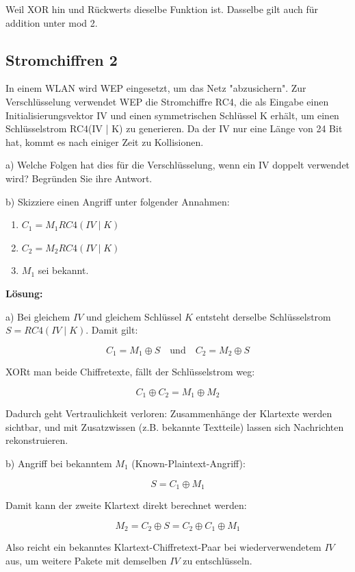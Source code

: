 \documentclass[a4paper]{article}
\begin{document}
Weil XOR hin und Rückwerts dieselbe Funktion ist. Dasselbe gilt auch für addition unter mod 2.

\subsection{Stromchiffren 2}

In einem WLAN wird WEP eingesetzt, um das Netz "abzusichern". Zur Verschlüsselung verwendet WEP die Stromchiffre RC4, die als Eingabe einen Initialisierungsvektor IV und einen symmetrischen Schlüssel K erhält, um einen Schlüsselstrom RC4(IV | K) zu generieren. Da der IV nur eine Länge von 24 Bit hat, kommt es nach einiger Zeit zu Kollisionen.

a) Welche Folgen hat dies für die Verschlüsselung, wenn ein IV doppelt verwendet wird? Begründen Sie ihre Antwort.

b) Skizziere einen Angriff unter folgender Annahmen:

\begin{enumerate}
    \item $C_1=M_1 RC4(IV \mid K)$
    \item $C_2=M_2 RC4(IV \mid K)$
    \item $M_1$ sei bekannt.
\end{enumerate}

\textbf{Lösung:}

a) Bei gleichem $IV$ und gleichem Schlüssel $K$ entsteht derselbe Schlüsselstrom
$S = RC4(IV \mid K)$. Damit gilt:

$$C_1 = M_1 \oplus S \quad\text{und}\quad C_2 = M_2 \oplus S$$

XORt man beide Chiffretexte, fällt der Schlüsselstrom weg:

$$C_1 \oplus C_2 = M_1 \oplus M_2$$

Dadurch geht Vertraulichkeit verloren: Zusammenhänge der Klartexte werden sichtbar,
und mit Zusatzwissen (z.B. bekannte Textteile) lassen sich Nachrichten rekonstruieren.

b) Angriff bei bekanntem $M_1$ (Known-Plaintext-Angriff):

$$S = C_1 \oplus M_1$$

Damit kann der zweite Klartext direkt berechnet werden:

$$M_2 = C_2 \oplus S = C_2 \oplus C_1 \oplus M_1$$

Also reicht ein bekanntes Klartext-Chiffretext-Paar bei wiederverwendetem $IV$ aus,
um weitere Pakete mit demselben $IV$ zu entschlüsseln.
\end{document}
